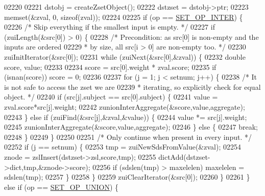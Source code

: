 \begin{DoxyCode}
02220 
02221     dstobj = createZsetObject();
02222     dstzset = dstobj->ptr;
02223     memset(&zval, 0, \textcolor{keyword}{sizeof}(zval));
02224 
02225     \textcolor{keywordflow}{if} (op == \hyperlink{server_8h_af089a3b4de4c69fa5d3c7f5ae0d94008}{SET\_OP\_INTER}) \{
02226         \textcolor{comment}{/* Skip everything if the smallest input is empty. */}
02227         \textcolor{keywordflow}{if} (zuiLength(&src[0]) > 0) \{
02228             \textcolor{comment}{/* Precondition: as src[0] is non-empty and the inputs are ordered}
02229 \textcolor{comment}{             * by size, all src[i > 0] are non-empty too. */}
02230             zuiInitIterator(&src[0]);
02231             \textcolor{keywordflow}{while} (zuiNext(&src[0],&zval)) \{
02232                 \textcolor{keywordtype}{double} score, value;
02233 
02234                 score = src[0].weight * zval.score;
02235                 \textcolor{keywordflow}{if} (isnan(score)) score = 0;
02236 
02237                 \textcolor{keywordflow}{for} (j = 1; j < setnum; j++) \{
02238                     \textcolor{comment}{/* It is not safe to access the zset we are}
02239 \textcolor{comment}{                     * iterating, so explicitly check for equal object. */}
02240                     \textcolor{keywordflow}{if} (src[j].subject == src[0].subject) \{
02241                         value = zval.score*src[j].weight;
02242                         zunionInterAggregate(&score,value,aggregate);
02243                     \} \textcolor{keywordflow}{else} \textcolor{keywordflow}{if} (zuiFind(&src[j],&zval,&value)) \{
02244                         value *= src[j].weight;
02245                         zunionInterAggregate(&score,value,aggregate);
02246                     \} \textcolor{keywordflow}{else} \{
02247                         \textcolor{keywordflow}{break};
02248                     \}
02249                 \}
02250 
02251                 \textcolor{comment}{/* Only continue when present in every input. */}
02252                 \textcolor{keywordflow}{if} (j == setnum) \{
02253                     tmp = zuiNewSdsFromValue(&zval);
02254                     znode = zslInsert(dstzset->zsl,score,tmp);
02255                     dictAdd(dstzset->dict,tmp,&znode->score);
02256                     \textcolor{keywordflow}{if} (sdslen(tmp) > maxelelen) maxelelen = sdslen(tmp);
02257                 \}
02258             \}
02259             zuiClearIterator(&src[0]);
02260         \}
02261     \} \textcolor{keywordflow}{else} \textcolor{keywordflow}{if} (op == \hyperlink{server_8h_af00a414b6d78bff8b325eb9cf82c3edb}{SET\_OP\_UNION}) \{

\end{DoxyCode}
